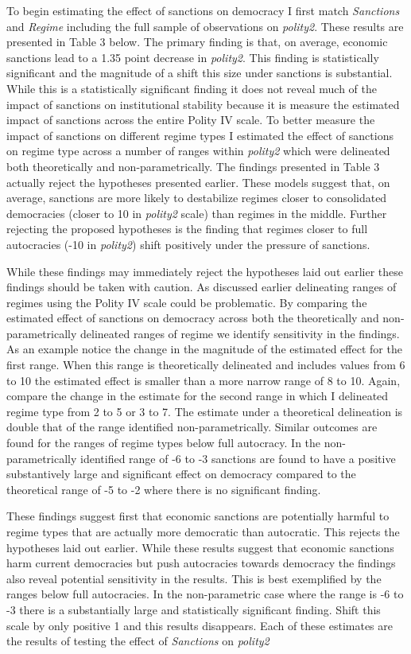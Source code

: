 \documentclass[a4paper]{article}\usepackage[]{graphicx}\usepackage[]{color}
\begin{document}
To begin estimating the effect of sanctions on democracy I first match \textit{Sanctions} and \textit{Regime} including the full sample of observations on \textit{polity2}. These results are presented in Table 3 below. The primary finding is that, on average, economic sanctions lead to a 1.35 point decrease in \textit{polity2}. This finding is statistically significant and the magnitude of a shift this size under sanctions is substantial. While this is a statistically significant finding it does not reveal much of the impact of sanctions on institutional stability because it is measure the estimated impact of sanctions across the entire Polity IV scale.  To better measure the impact of sanctions on different regime types I estimated the effect of sanctions on regime type across a number of ranges within \textit{polity2} which were delineated both theoretically and non-parametrically. The findings presented in Table 3 actually reject the hypotheses presented earlier. These models suggest that, on average, sanctions are more likely to destabilize regimes closer to consolidated democracies (closer to 10 in \textit{polity2} scale) than regimes in the middle. Further rejecting the proposed hypotheses is the finding that regimes closer to full autocracies (-10 in \textit{polity2}) shift positively under the pressure of sanctions. 
\par
While these findings may immediately reject the hypotheses laid out earlier these findings should be taken with caution. As discussed earlier delineating ranges of regimes using the Polity IV scale could be problematic. By comparing the estimated effect of sanctions on democracy across both the theoretically and non-parametrically delineated ranges of regime we identify sensitivity in the findings. As an example notice the change in the magnitude of the estimated effect for the first range. When this range is theoretically delineated and includes values from 6 to 10 the estimated effect is smaller than a more narrow range of 8 to 10. Again, compare the change in the estimate for the second range in which I delineated regime type from 2 to 5 or 3 to 7. The estimate under a theoretical delineation is double that of the range identified non-parametrically. Similar outcomes are found for the ranges of regime types below full autocracy. In the non-parametrically identified range of -6 to -3 sanctions are found to have a positive substantively large and significant effect on democracy compared to the theoretical range of -5 to -2 where there is no significant finding. 
\par
These findings suggest first that economic sanctions are potentially harmful to regime types that are actually more democratic than autocratic. This rejects the hypotheses laid out earlier. While these results suggest that economic sanctions harm current democracies but push autocracies towards democracy the findings also reveal potential sensitivity in the results. This is best exemplified by the ranges below full autocracies. In the non-parametric case where the range is -6 to -3 there is a substantially large and statistically significant finding. Shift this scale by only positive 1 and this results disappears. Each of these estimates are the results of testing the effect of \textit{Sanctions} on \textit{polity2}
\end{document}
